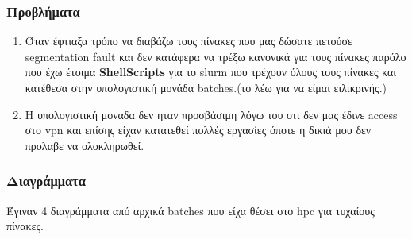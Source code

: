 \documentclass[10pt]{report}
\begin{document}
\subsubsection{Προβλήματα}
\begin{enumerate}
\item Όταν έφτιαξα τρόπο να διαβάζω τους πίνακες που μας δώσατε πετούσε segmentation fault και δεν κατάφερα να τρέξω κανονικά για τους πίνακες παρόλο που έχω έτοιμα \textbf{ShellScripts} για το slurm που τρέχουν όλους τους πίνακες και κατέθεσα στην υπολογιστική μονάδα batches.(το λέω για να είμαι ειλικρινής.)
\item Η υπολογιστική μοναδα δεν ηταν προσβάσιμη λόγω του οτι δεν μας έδινε access στο vpn και επίσης είχαν κατατεθεί πολλές εργασίες όποτε η δικιά μου δεν προλαβε να ολοκληρωθεί.
\end{enumerate}
\subsubsection{Διαγράμματα}
Έγιναν 4 διαγράμματα από αρχικά batches που είχα θέσει στο hpc για τυχαίους πίνακες.
\end{document}
